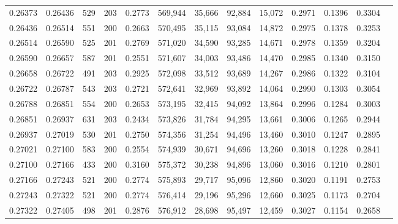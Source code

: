\begin{tabular}{rrrrrrrrrrrrr}
0.26373 & 0.26436 &   529 & 203 &                                     0.2773 & 569,944 &  35,666 &  92,884 &  15,072 & 0.2971 & 0.1396 & 0.3304 \\
0.26436 & 0.26514 &   551 & 200 &                                     0.2663 & 570,495 &  35,115 &  93,084 &  14,872 & 0.2975 & 0.1378 & 0.3253 \\
0.26514 & 0.26590 &   525 & 201 &                                     0.2769 & 571,020 &  34,590 &  93,285 &  14,671 & 0.2978 & 0.1359 & 0.3204 \\
0.26590 & 0.26657 &   587 & 201 &                                     0.2551 & 571,607 &  34,003 &  93,486 &  14,470 & 0.2985 & 0.1340 & 0.3150 \\
0.26658 & 0.26722 &   491 & 203 &                                     0.2925 & 572,098 &  33,512 &  93,689 &  14,267 & 0.2986 & 0.1322 & 0.3104 \\
0.26722 & 0.26787 &   543 & 203 &                                     0.2721 & 572,641 &  32,969 &  93,892 &  14,064 & 0.2990 & 0.1303 & 0.3054 \\
0.26788 & 0.26851 &   554 & 200 &                                     0.2653 & 573,195 &  32,415 &  94,092 &  13,864 & 0.2996 & 0.1284 & 0.3003 \\
0.26851 & 0.26937 &   631 & 203 &                                     0.2434 & 573,826 &  31,784 &  94,295 &  13,661 & 0.3006 & 0.1265 & 0.2944 \\
0.26937 & 0.27019 &   530 & 201 &                                     0.2750 & 574,356 &  31,254 &  94,496 &  13,460 & 0.3010 & 0.1247 & 0.2895 \\
0.27021 & 0.27100 &   583 & 200 &                                     0.2554 & 574,939 &  30,671 &  94,696 &  13,260 & 0.3018 & 0.1228 & 0.2841 \\
0.27100 & 0.27166 &   433 & 200 &                                     0.3160 & 575,372 &  30,238 &  94,896 &  13,060 & 0.3016 & 0.1210 & 0.2801 \\
0.27166 & 0.27243 &   521 & 200 &                                     0.2774 & 575,893 &  29,717 &  95,096 &  12,860 & 0.3020 & 0.1191 & 0.2753 \\
0.27243 & 0.27322 &   521 & 200 &                                     0.2774 & 576,414 &  29,196 &  95,296 &  12,660 & 0.3025 & 0.1173 & 0.2704 \\
0.27322 & 0.27405 &   498 & 201 &                                     0.2876 & 576,912 &  28,698 &  95,497 &  12,459 & 0.3027 & 0.1154 & 0.2658 \\

\end{tabular}
